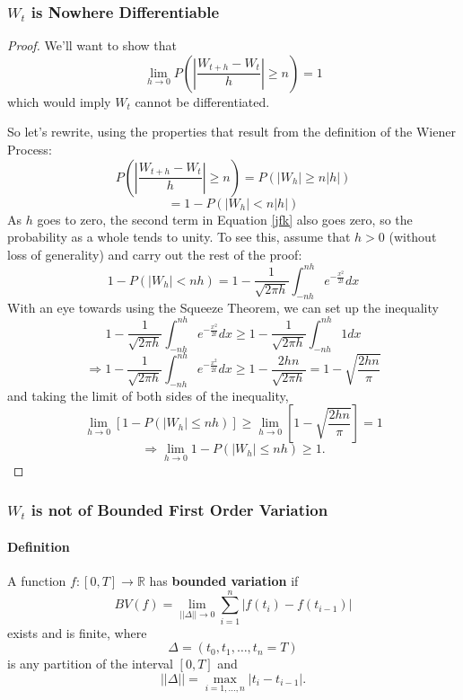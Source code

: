 \documentclass[a4paper,12pt]{scrartcl}
\begin{document}
\subsubsection{$W_t$ is Nowhere Differentiable}
      \begin{proof}
	 We'll want to show that 
	    \[\lim_{h \rightarrow 0} P\left( \left\lvert 
	       \frac{W_{t+h} - W_t}{h} \right\rvert \geq n \right) =1 \]
	 which would imply $W_t$ cannot be differentiated.

	 So let's rewrite, using the properties that result from the
	 definition of the Wiener Process:
	    \[ P\left( \left\lvert \frac{W_{t+h} - W_t}{h} 
	       \right\rvert \geq n \right) = P(|W_h| \geq n|h|) \]
	 \begin{equation}
	    \label{jfk}
	     = 1 - P(|W_h| < n|h|) 
	 \end{equation}
	 As $h$ goes to zero, the second term in Equation \ref{jfk} also
	 goes zero, so the probability as a whole tends to unity.  To 
	 see this, assume that $h>0$ (without loss of generality) and
	 carry out the rest of the proof:
	 \[ 1- P(|W_h| < nh) = 1- \frac{1}{\sqrt{2\pi h}} \int^{nh}_{-nh}
	    e^{-\frac{x^2}{2t}} dx \]
	 With an eye towards using the Squeeze Theorem, we can set up
	 the inequality
	    \[   1- \frac{1}{\sqrt{2\pi h}} \int^{nh}_{-nh}
	       e^{-\frac{x^2}{2t}} dx \geq 1 - \frac{1}{\sqrt{2\pi h}} 
	       \int^{nh}_{-nh} 1 dx \]
	    \[ \Rightarrow  1- \frac{1}{\sqrt{2\pi h}} \int^{nh}_{-nh}
	       e^{-\frac{x^2}{2t}} dx \geq 1 -\frac{2hn}{ \sqrt{2\pi h}} 
	       = 1 - \sqrt{\frac{2hn}{\pi}} \]
	 and taking the limit of both sides of the inequality,
	 \[ \lim_{h\rightarrow 0}\left[1 - P(|W_h| \leq nh) \right] \geq 
	    \lim_{h\rightarrow 0} \left[ 1-\sqrt{\frac{2hn}{\pi}}\right] 
	    = 1 \]
	 \[ \Rightarrow \lim_{h\rightarrow 0} 1 - P(|W_h| \leq nh)
	    \geq 1.\]
	 \end{proof}
      

\subsubsection{$W_t$ is not of Bounded First Order Variation}

      \paragraph{Definition} A function $f: [0,T] \rightarrow \mathbb{R}$
      has \textbf{bounded variation} if 
	 \[ BV(f) = \lim_{||\Delta|| \rightarrow 0}\sum_{i=1}^n|f(t_i)- 
	    f(t_{i-1})| \]
      exists and is finite, where 
	 \[ \Delta = (t_0, t_1, \ldots , t_n = T) \]
      is any partition of the interval $[0,T]$ and 
	 \[ || \Delta || = \max_{i = 1, \ldots, n} |t_i - t_{i-1}|. \]
\end{document}
